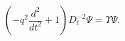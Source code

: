 \begin{equation}
\label{Psi-m}
 \left(-q^2
\frac{d^2}{dt^2}+1\right)D^{-2}_{t}\Psi = \Upsilon \Psi.
\end{equation}


